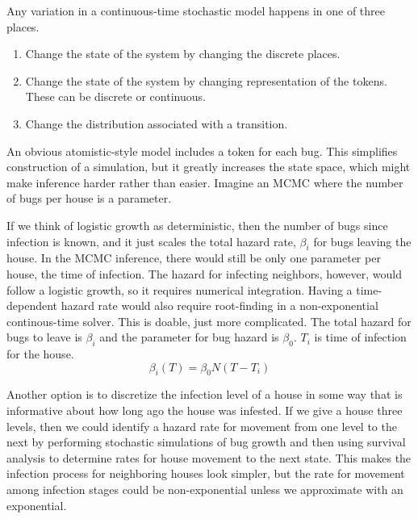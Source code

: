 \documentclass{article}
\begin{document}
Any variation in a continuous-time stochastic model happens in
one of three places.
\begin{enumerate}
  \item Change the state of the system by changing the discrete
        places.
  \item Change the state of the system by changing representation
        of the tokens. These can be discrete or continuous.
  \item Change the distribution associated with a transition.
\end{enumerate}

An obvious atomistic-style model includes a token for each bug.
This simplifies construction of a simulation, but it greatly
increases the state space, which might make inference harder
rather than easier. Imagine an MCMC where the number of bugs
per house is a parameter.

If we think of logistic growth as deterministic, then the number
of bugs since infection is known, and it just scales the total
hazard rate, $\beta_i$ for bugs leaving the house. In the MCMC inference,
there would still be only one parameter per house, the time
of infection. The hazard for infecting neighbors, however,
would follow a logistic growth, so it requires numerical integration.
Having a time-dependent hazard rate would also require root-finding
in a non-exponential continous-time solver. This is doable, just
more complicated. The total hazard for bugs to leave is $\beta_i$
and the parameter for bug hazard is $\beta_0$. $T_i$ is time of
infection for the house.
\begin{equation}
  \beta_i(T)=\beta_0N(T-T_i)
\end{equation}

Another option is to discretize the infection level of a house in 
some way that is informative about how long ago the house
was infested. If we give a house three levels, then we could 
identify a hazard rate for movement from one level to the next
by performing stochastic simulations of bug growth and then using
survival analysis to determine rates for house movement to the
next state. This makes the infection process for neighboring
houses look simpler, but the rate for movement among infection
stages could be non-exponential unless we approximate with an exponential.
\end{document}
